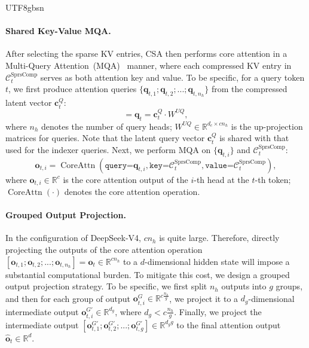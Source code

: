 \documentclass[11pt, a4paper, logo, copyright, nonumbering]{deepseek}
\newcommand{\dsviv}{DeepSeek-V4}
\newcommand{\csa}{CSA}
\begin{document}
\begin{CJK*}{UTF8}{gbsn}
\paragraph{Shared Key-Value MQA.}
After selecting the sparse KV entries, \csa{} then performs core attention in a Multi-Query Attention~(MQA)~\citep{mqa} manner, where each compressed KV entry in $\mathcal{C}^{\text{SprsComp}}_t$ serves as both attention key and value. 
To be specific, for a query token $t$, we first produce attention queries $\{\mathbf{q}_{t, 1};\mathbf{q}_{t, 2};...;\mathbf{q}_{t, n_{h}}\}$ from the compressed latent vector $\mathbf{c}_{t}^{Q}$:
\begin{equation}
    [\mathbf{q}_{t, 1};\mathbf{q}_{t, 2};...;\mathbf{q}_{t, n_{h}}] = \mathbf{q}_{t} = \mathbf{c}_{t}^{Q} \cdot W^{UQ},
\end{equation}
where $n_{h}$ denotes the number of query heads; $W^{UQ} \in \mathbb{R}^{d_c \times c n_h}$ is the up-projection matrices for queries.
Note that the latent query vector $\mathbf{c}_{t}^{Q}$ is shared with that used for the indexer queries. 
Next, we perform MQA on $\{\mathbf{q}_{t, i}\}$ and $\mathcal{C}^{\text{SprsComp}}_t$: 
\begin{equation}
    \mathbf{o}_{t,i} = \operatorname{CoreAttn}\left( \texttt{query=}\mathbf{q}_{t,i}, \texttt{key=}\mathcal{C}^{\text{SprsComp}}_t, \texttt{value=}\mathcal{C}^{\text{SprsComp}}_t \right),
\end{equation}
where $\mathbf{o}_{t,i} \in \mathbb{R}^{c}$ is the core attention output of the $i$-th head at the $t$-th token; $\operatorname{CoreAttn}(\cdot)$ denotes the core attention operation. 

\paragraph{Grouped Output Projection.}
In the configuration of \dsviv{}, $c n_h$ is quite large.
Therefore, directly projecting the outputs of the core attention operation $[\mathbf{o}_{t,1}; \mathbf{o}_{t,2}; ...; \mathbf{o}_{t,n_h}]=\mathbf{o}_{t} \in \mathbb{R}^{c n_h}$ to a $d$-dimensional hidden state will impose a substantial computational burden. 
To mitigate this cost, we design a grouped output projection strategy.
To be specific, we first split $n_h$ outputs into $g$ groups, and then for each group of output $\mathbf{o}^G_{t, i} \in \mathbb{R}^{c \frac{n_h}{g}}$, we project it to a $d_g$-dimensional intermediate output $\mathbf{o}^{G'}_{t, i} \in \mathbb{R}^{d_g}$, where $d_g < c \frac{n_h}{g}$. 
Finally, we project the intermediate output $[\mathbf{o}^{G'}_{t, 1}; \mathbf{o}^{G'}_{t, 2}; ...; \mathbf{o}^{G'}_{t, g}] \in \mathbb{R}^{d_gg}$ to the final attention output $\mathbf{\hat{o}}_{t} \in \mathbb{R}^{d}$. 


\end{CJK*}
\end{document}
